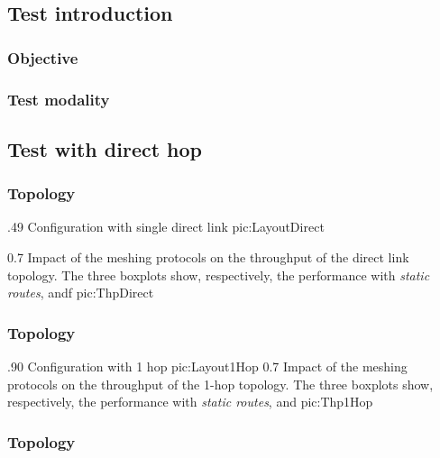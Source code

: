 \subsection{Test introduction}

    \subsubsection{Objective}

    \subsubsection{Test modality}

\subsection{Test with direct hop}

    \subsubsection{Topology}

                {.49\columnwidth}
                {Configuration with single direct link}
                {pic:LayoutDirect}

                {0.7 \columnwidth}
                {Impact of the meshing protocols on the throughput of the
                 direct link topology. The three boxplots show,
                 respectively, the performance with \emph{static routes},
                 \emph{\batman} andf \emph{\olsr}}
                {pic:ThpDirect}


    \subsubsection{Topology}

                {.90\columnwidth}
                {Configuration with 1 hop}
                {pic:Layout1Hop}
                {0.7 \columnwidth}
                {Impact of the meshing protocols on the throughput of the
                 1-hop topology. The three boxplots show, respectively, the
                 performance with \emph{static routes}, \emph{\batman} and
                 \emph{\olsr}}
                {pic:Thp1Hop}


    \subsubsection{Topology}

